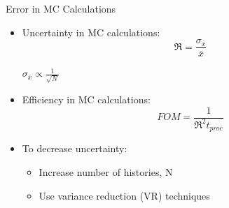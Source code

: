 \documentclass{beamer}
\begin{document}
\begin{frame}{Error in MC Calculations}
\begin{itemize}
\item{Uncertainty in MC calculations:}
\begin{equation} \label{eq:1.2}
		\Re = \frac{\sigma_{\overline{x}}}{{\overline{x}}}
\end{equation}
		\begin{center}
		{$\sigma_{\overline{x}} \propto \frac{1}{\sqrt{N}}$}%
		\end{center}
\item{Efficiency in MC calculations:}
\begin{equation} \label{eq:1.3}
	FOM = \frac{1}{{{{\Re}^2}t_{proc}}}
\end{equation}

\item{To decrease uncertainty:}
  \begin{itemize}
  \item{Increase number of histories, N}
  \item{Use variance reduction (VR) techniques}
  \end{itemize}
\end{itemize}
\end{frame}
\end{document}
